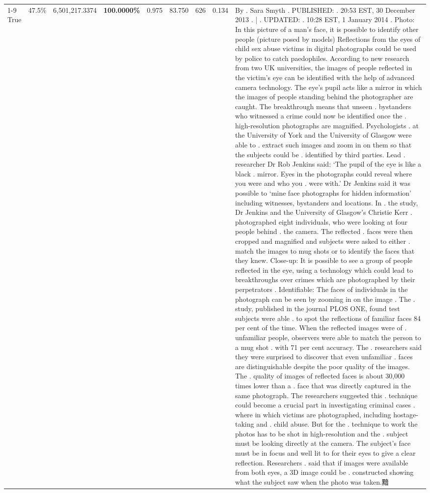 \begin{table}[H]
\begin{tabular}{lllrlllll}
\cline{1-9} \cline{2-9}
True & 47.5\% & 6,501,217.3374 & \bfseries \color{red} 100.0000\% & 0.975 & 83.750 & 626 & 0.134 & By . Sara Smyth . PUBLISHED: . 20:53 EST, 30 December 2013 . | . UPDATED: . 10:28 EST, 1 January 2014 . Photo: In this picture of a man's face, it is possible to identify other people (picture posed by models) Reflections from the eyes of child sex abuse victims in digital photographs could be used by police to catch paedophiles. According to new research from two UK universities, the images of people reflected in the victim's eye can be identified with the help of advanced camera technology. The eye's pupil acts like a mirror in which the images of people standing behind the photographer are caught. The breakthrough means that unseen . bystanders who witnessed a crime could now be identified once the . high-resolution photographs are magnified. Psychologists . at the University of York and the University of Glasgow were able to . extract such images and zoom in on them so that the subjects could be . identified by third parties. Lead . researcher Dr Rob Jenkins said: ‘The pupil of the eye is like a black . mirror. Eyes in the photographs could reveal where you were and who you . were with.' Dr Jenkins said it was possible to ‘mine face photographs for hidden information' including witnesses, bystanders and locations. In . the study, Dr Jenkins and the University of Glasgow's Christie Kerr . photographed eight individuals, who were looking at four people behind . the camera. The reflected . faces were then cropped and magnified and subjects were asked to either . match the images to mug shots or to identify the faces that they knew. Close-up: It is possible to see a group of people reflected in the eye, using a technology which could lead to breakthroughs over crimes which are photographed by their perpetrators . Identifiable: The faces of individuals in the photograph can be seen by zooming in on the image . The . study, published in the journal PLOS ONE, found test subjects were able . to spot the reflections of familiar faces 84 per cent of the time. When the reflected images were of . unfamiliar people, observers were able to match the person to a mug shot . with 71 per cent accuracy. The . researchers said they were surprised to discover that even unfamiliar . faces are distinguishable despite the poor quality of the images. The . quality of images of reflected faces is about 30,000 times lower than a . face that was directly captured in the same photograph. The researchers suggested this . technique could become a crucial part in investigating criminal cases . where in which victims are photographed, including hostage-taking and . child abuse. But for the . technique to work the photos has to be shot in high-resolution and the . subject must be looking directly at the camera. The subject's face must be in focus and well lit to for their eyes to give a clear reflection. Researchers . said that if images were available from both eyes, a 3D image could be . constructed showing what the subject saw when the photo was taken.黯 \\

\end{tabular}
\end{table}
